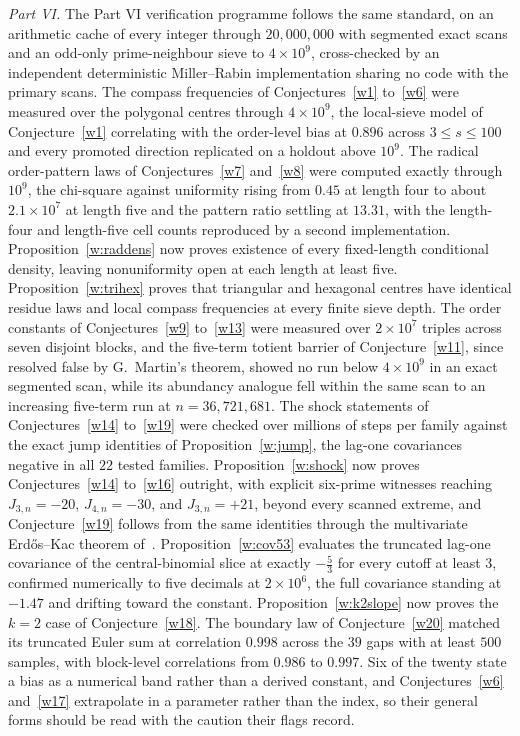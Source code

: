 \documentclass[11pt]{article}
\theoremstyle{definition}
\begin{document}
\emph{Part VI.}  The Part VI verification programme follows the same standard, on an arithmetic cache of every integer through $20{,}000{,}000$ with segmented exact scans and an odd-only prime-neighbour sieve to $4\times10^9$, cross-checked by an independent deterministic Miller--Rabin implementation sharing no code with the primary scans.  The compass frequencies of Conjectures~\ref{w1} to~\ref{w6} were measured over the polygonal centres through $4\times10^9$, the local-sieve model of Conjecture~\ref{w1} correlating with the order-level bias at $0.896$ across $3\le s\le100$ and every promoted direction replicated on a holdout above $10^9$.  The radical order-pattern laws of Conjectures~\ref{w7} and~\ref{w8} were computed exactly through $10^9$, the chi-square against uniformity rising from $0.45$ at length four to about $2.1\times10^7$ at length five and the pattern ratio settling at $13.31$, with the length-four and length-five cell counts reproduced by a second implementation.  Proposition~\ref{w:raddens} now proves existence of every fixed-length conditional density, leaving nonuniformity open at each length at least five.  Proposition~\ref{w:trihex} proves that triangular and hexagonal centres have identical residue laws and local compass frequencies at every finite sieve depth.  The order constants of Conjectures~\ref{w9} to~\ref{w13} were measured over $2\times10^7$ triples across seven disjoint blocks, and the five-term totient barrier of Conjecture~\ref{w11}, since resolved false by G.~Martin's theorem, showed no run below $4\times10^9$ in an exact segmented scan, while its abundancy analogue fell within the same scan to an increasing five-term run at $n=36{,}721{,}681$.  The shock statements of Conjectures~\ref{w14} to~\ref{w19} were checked over millions of steps per family against the exact jump identities of Proposition~\ref{w:jump}, the lag-one covariances negative in all $22$ tested families.  Proposition~\ref{w:shock} now proves Conjectures~\ref{w14} to~\ref{w16} outright, with explicit six-prime witnesses reaching $J_{3,n}=-20$, $J_{4,n}=-30$, and $J_{3,n}=+21$, beyond every scanned extreme, and Conjecture~\ref{w19} follows from the same identities through the multivariate Erd\H{o}s--Kac theorem of~\cite{ELS22}.  Proposition~\ref{w:cov53} evaluates the truncated lag-one covariance of the central-binomial slice at exactly $-\tfrac53$ for every cutoff at least $3$, confirmed numerically to five decimals at $2\times10^6$, the full covariance standing at $-1.47$ and drifting toward the constant.  Proposition~\ref{w:k2slope} now proves the $k=2$ case of Conjecture~\ref{w18}.  The boundary law of Conjecture~\ref{w20} matched its truncated Euler sum at correlation $0.998$ across the $39$ gaps with at least $500$ samples, with block-level correlations from $0.986$ to $0.997$.  Six of the twenty state a bias as a numerical band rather than a derived constant, and Conjectures~\ref{w6} and~\ref{w17} extrapolate in a parameter rather than the index, so their general forms should be read with the caution their flags record.
\end{document}
